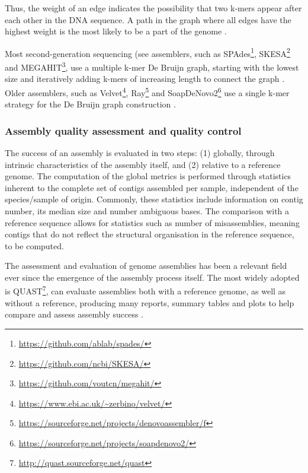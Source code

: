 Thus, the weight of an edge indicates the possibility that two k-mers appear after each other in the DNA sequence. A path in the graph where all edges have the highest weight is the most likely to be a part of the genome \citep{bayat_methods_2020}.

Most second-generation sequencing (see  assemblers, such as SPAdes\footnote{\url{https://github.com/ablab/spades/}}, SKESA\footnote{\url{https://github.com/ncbi/SKESA/}} and MEGAHIT\footnote{\url{https://github.com/voutcn/megahit/}}, use a multiple k-mer De Bruijn graph, starting with the lowest size and iteratively adding k-mers of increasing length to connect the graph \citep{bankevich_spades_2012, souvorov_skesa_2018, li_megahit_2015}. Older assemblers, such as Velvet\footnote{\url{https://www.ebi.ac.uk/~zerbino/velvet/}}, Ray\footnote{\url{https://sourceforge.net/projects/denovoassembler/f}} and SoapDeNovo2\footnote{\url{https://sourceforge.net/projects/soapdenovo2/}} use a single k-mer strategy for the De Bruijn graph construction \citep{zerbino_velvet_2008, boisvert_ray_2010, luo_soapdenovo2_2012}. 

\subsubsection{Assembly quality assessment and quality control} \label{ssec:_intro_assembly_quality}

The success of an assembly is evaluated in two steps: (1) globally, through intrinsic characteristics of the assembly itself, and (2) relative to a reference genome. The computation of the global metrics is performed through statistics inherent to the complete set of contigs assembled per sample, independent of the species/sample of origin. Commonly, these statistics include information on contig number, its median size and number ambiguous bases. The comparison with a reference sequence allows for statistics such as number of misassemblies, meaning contigs that do not reflect the structural organisation in the reference sequence, to be computed. 

The assessment and evaluation of genome assemblies has been a relevant field ever since the emergence of the assembly process itself. 
The most widely adopted is QUAST\footnote{\url{http://quast.sourceforge.net/quast}}, can evaluate assemblies both with a reference genome, as well as without a reference, producing many reports, summary tables and plots to help compare and assess assembly success \citep{gurevich_quast_2013}. 

